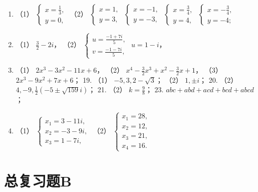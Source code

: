 \begin{enumerate}[start=15]
\item
  （1）
  \(\left\{ \begin{array}{l} x = \frac{1}{3}, \\ y = 0, \end{array} \right.\)
  （2）
  \(\left\{ \begin{array}{l} x = 1, \\ y = 3, \end{array} \right.\)
  \(\left\{ \begin{array}{l} x = -1, \\ y = -3, \end{array} \right.\)
  \(\left\{ \begin{array}{l} x = \frac{3}{4}, \\ y = 4, \end{array} \right.\)
  \(\left\{ \begin{array}{l} x = -\frac{3}{4}, \\ y = -4; \end{array} \right.\)
\item
  （1） \(\frac{3}{2} - 2i\)， （2）
  \(\left\{ \begin{array}{l} u = \frac{-1 + 7i}{5}, \\ v = \frac{-1 - 7i}{5}, \end{array} \right.\)
  \(u = 1 - i\)，
\item
  （1） \(2x^{3} - 3x^{2} - 11x + 6\)， （2）
  \(x^{4} - \frac{3}{2} x^{3} + x^{2} - \frac{3}{2} x + 1\)， （3）
  \(2x^{3} - 9x^{2} + 7x + 6\)； 19. （1） \(-5, 3, 2 - \sqrt{3}\)；
  （2） \(1, \pm i\)； 20. （2）
  \(4, -9, \frac{1}{2} (-5 \pm \sqrt{159}i)\)； 21. （2）
  \(k = \frac{9}{8}\)； 23. \(abc + abd + acd + bcd + abcd\)；
\item
  （1）
  \(\left\{ \begin{array}{l} x_{1} = 3 - 11i, \\ x_{2} = -3 - 9i, \\ x_{3} = 1 - 7i, \end{array} \right.\)
  （2）
  \(\left\{ \begin{array}{l} x_{1} = 28, \\ x_{2} = 12, \\ x_{3} = 21, \\ x_{4} = 16. \end{array} \right.\)
\end{enumerate}

\section{总复习题B}

